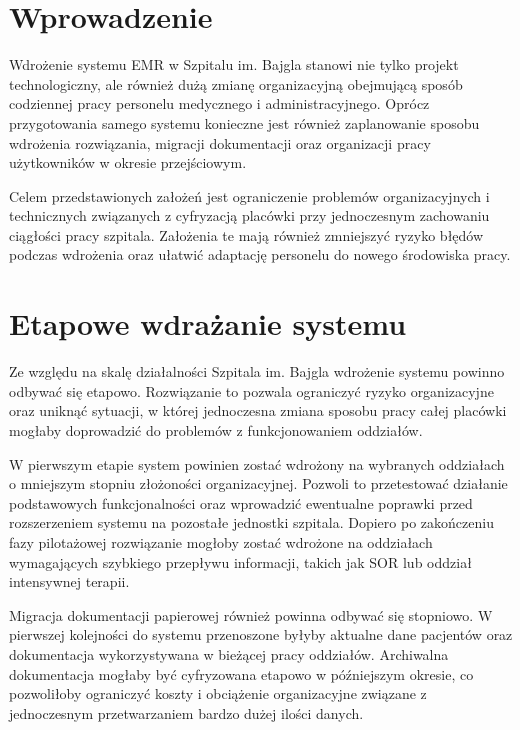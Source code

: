\label{chapter:implementation}

\section{Wprowadzenie}

Wdrożenie systemu EMR w Szpitalu im. Bajgla stanowi nie tylko projekt technologiczny, ale również dużą zmianę organizacyjną obejmującą sposób codziennej pracy personelu medycznego i administracyjnego. Oprócz przygotowania samego systemu konieczne jest również zaplanowanie sposobu wdrożenia rozwiązania, migracji dokumentacji oraz organizacji pracy użytkowników w okresie przejściowym.

Celem przedstawionych założeń jest ograniczenie problemów organizacyjnych i technicznych związanych z cyfryzacją placówki przy jednoczesnym zachowaniu ciągłości pracy szpitala. Założenia te mają również zmniejszyć ryzyko błędów podczas wdrożenia oraz ułatwić adaptację personelu do nowego środowiska pracy.

\section{Etapowe wdrażanie systemu}

Ze względu na skalę działalności Szpitala im. Bajgla wdrożenie systemu powinno odbywać się etapowo. Rozwiązanie to pozwala ograniczyć ryzyko organizacyjne oraz uniknąć sytuacji, w której jednoczesna zmiana sposobu pracy całej placówki mogłaby doprowadzić do problemów z funkcjonowaniem oddziałów.

W pierwszym etapie system powinien zostać wdrożony na wybranych oddziałach o mniejszym stopniu złożoności organizacyjnej. Pozwoli to przetestować działanie podstawowych funkcjonalności oraz wprowadzić ewentualne poprawki przed rozszerzeniem systemu na pozostałe jednostki szpitala. Dopiero po zakończeniu fazy pilotażowej rozwiązanie mogłoby zostać wdrożone na oddziałach wymagających szybkiego przepływu informacji, takich jak SOR lub oddział intensywnej terapii.

Migracja dokumentacji papierowej również powinna odbywać się stopniowo. W pierwszej kolejności do systemu przenoszone byłyby aktualne dane pacjentów oraz dokumentacja wykorzystywana w bieżącej pracy oddziałów. Archiwalna dokumentacja mogłaby być cyfryzowana etapowo w późniejszym okresie, co pozwoliłoby ograniczyć koszty i obciążenie organizacyjne związane z jednoczesnym przetwarzaniem bardzo dużej ilości danych.

